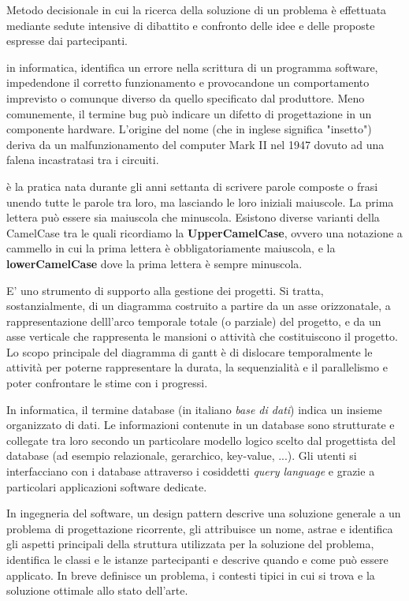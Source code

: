\documentclass{scalatekids-article}
\begin{document}
 Metodo decisionale in cui la ricerca della soluzione di un problema è effettuata mediante sedute intensive di dibattito e confronto delle idee e delle proposte espresse dai partecipanti.

 in informatica, identifica un errore nella scrittura di un programma software, impedendone il corretto funzionamento e provocandone un comportamento imprevisto o comunque diverso da quello specificato dal produttore. Meno comunemente, il termine bug può indicare un difetto di progettazione in un componente hardware.
L'origine del nome (che in inglese significa "insetto") deriva da un malfunzionamento del computer Mark II nel 1947 dovuto ad una falena incastratasi tra i circuiti.


 è la pratica nata durante gli anni settanta di scrivere parole composte o frasi unendo tutte le parole tra loro, ma lasciando le loro iniziali maiuscole. La prima lettera può essere sia maiuscola che minuscola.
Esistono diverse varianti della CamelCase tra le quali ricordiamo la \textbf{UpperCamelCase}, ovvero una notazione a cammello in cui la prima lettera è obbligatoriamente maiuscola, e la \textbf{lowerCamelCase} dove la prima lettera è sempre minuscola.


 E' uno strumento di supporto alla gestione dei progetti.
Si tratta, sostanzialmente, di un diagramma costruito a partire da un asse orizzonatale, a rappresentazione delll'arco temporale totale (o parziale) del progetto, e da un asse verticale che rappresenta le mansioni o attività che costituiscono il progetto.
Lo scopo principale del diagramma di gantt è di dislocare temporalmente le attività per poterne rappresentare la durata, la sequenzialità e il parallelismo e poter confrontare le stime con i progressi.

 In informatica, il termine database (in italiano \textit{base di dati}) indica un insieme organizzato di dati.
Le informazioni contenute in un database sono strutturate e collegate tra loro secondo un particolare modello logico scelto dal progettista del database (ad esempio relazionale, gerarchico, key-value, ...).
Gli utenti si interfacciano con i database attraverso i cosiddetti \textit{query language} e grazie a particolari applicazioni software dedicate.

 In ingegneria del software, un design pattern descrive una soluzione generale a un problema di progettazione ricorrente, gli attribuisce un nome, astrae e identifica gli aspetti principali della struttura utilizzata per la soluzione del problema, identifica le classi e le istanze partecipanti e descrive quando e come può essere applicato. In breve definisce un problema, i contesti tipici in cui si trova e la soluzione ottimale allo stato dell'arte.
\end{document}
